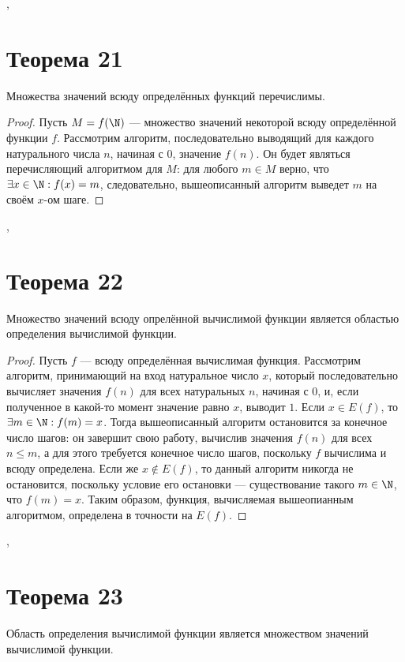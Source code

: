 \documentclass[a4paper,12pt]{article}
\begin{document}
    \sep
    
    \section {Теорема 21}
    \begin{theorem}
    Множества значений всюду определённых функций перечислимы.
    \end{theorem}
    \begin{proof} 
    Пусть $M=f(\N)$ --- множество значений некоторой всюду определённой функции $f$. Рассмотрим алгоритм, последовательно выводящий для каждого натурального числа $n$, начиная с $0$, значение $f(n)$. Он будет являться перечисляющий алгоритмом для $M$: для любого $m\in M$ верно, что $\exists x \in \N : f(x) = m$, следовательно, вышеописанный алгоритм выведет $m$ на своём $x$-ом шаге.
    \end{proof}
	
	\sep
    
    \section {Теорема 22}
    \begin{theorem}
    Множество значений всюду опрелённой вычислимой функции является областью определения вычислимой функции.
    \end{theorem} 
    \begin{proof} Пусть $f$ --- всюду определённая вычислимая функция. Рассмотрим алгоритм, принимающий на вход натуральное число $x$, который последовательно вычисляет значения $f(n)$ для всех натуральных $n$, начиная с $0$, и, если полученное в какой-то момент значение равно $x$, выводит $1$. Если $x\in E(f)$, то $\exists m \in \N : f(m) = x$. Тогда вышеописанный алгоритм остановится за конечное число шагов: он завершит свою работу, вычислив значения $f(n)$ для всех $n\leqslant m$, а для этого требуется конечное число шагов, поскольку $f$ вычислима и всюду определена. Если же $x\not\in E(f)$, то данный алгоритм никогда не остановится, поскольку условие его остановки --- существование такого $m\in\N$, что $f(m)=x$. Таким образом, функция, вычисляемая вышеопианным алгоритмом, определена в точности на $E(f)$.
    \end{proof}
	
	\sep
    \section {Теорема 23}
    \begin{theorem}
        Область определения вычислимой функции является множеством значений вычислимой функции.
    \end{theorem}
    
\end{document}
